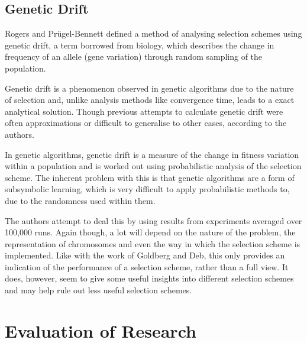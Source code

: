 \documentclass[10pt, a4paper]{article}
\begin{document}
\subsection{Genetic Drift}
Rogers and Pr\"{u}gel-Bennett\cite{Rogers1999Genetic} defined a method of 
analysing selection schemes using genetic drift, a term borrowed from biology,
which describes the change in frequency of an allele (gene variation) through
random sampling of the population.

Genetic drift is a phenomenon observed in genetic algorithms due to the nature
of selection and, unlike analysis methods like convergence time, leads to a
exact analytical solution. Though previous attempts to calculate genetic drift
were often approximations or difficult to generalise to other cases, according
to the authors.

In genetic algorithms, genetic drift is a measure of the change in fitness
variation within a population and is worked out using probabilistic analysis of
the selection scheme. The inherent problem with this is that genetic algorithms
are a form of subsymbolic learning, which is very difficult to apply 
probabilistic methods to, due to the randomness used within them.

The authors attempt to deal this by using results from experiments averaged 
over 100,000 runs. Again though, a lot will depend on the nature of the 
problem, the representation of chromosomes and even the way in which the
selection scheme is implemented. Like with the work of Goldberg and Deb, this 
only provides an indication of the performance of a selection scheme, rather
than a full view. It does, however, seem to give some useful insights into 
different selection schemes and may help rule out less useful selection 
schemes.




\newpage
\section{Evaluation of Research}

\newpage


\end{document}
